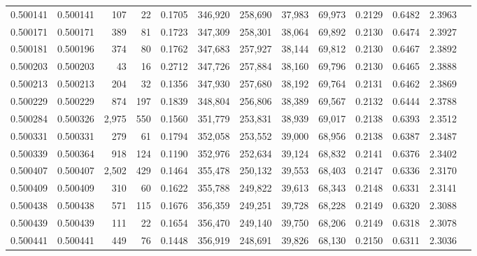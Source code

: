 \begin{tabular}{rrrrrrrrrrrrr}
0.500141 & 0.500141 &   107 &    22 &                                     0.1705 & 346,920 & 258,690 &  37,983 &  69,973 & 0.2129 & 0.6482 & 2.3963 \\
0.500171 & 0.500171 &   389 &    81 &                                     0.1723 & 347,309 & 258,301 &  38,064 &  69,892 & 0.2130 & 0.6474 & 2.3927 \\
0.500181 & 0.500196 &   374 &    80 &                                     0.1762 & 347,683 & 257,927 &  38,144 &  69,812 & 0.2130 & 0.6467 & 2.3892 \\
0.500203 & 0.500203 &    43 &    16 &                                     0.2712 & 347,726 & 257,884 &  38,160 &  69,796 & 0.2130 & 0.6465 & 2.3888 \\
0.500213 & 0.500213 &   204 &    32 &                                     0.1356 & 347,930 & 257,680 &  38,192 &  69,764 & 0.2131 & 0.6462 & 2.3869 \\
0.500229 & 0.500229 &   874 &   197 &                                     0.1839 & 348,804 & 256,806 &  38,389 &  69,567 & 0.2132 & 0.6444 & 2.3788 \\
0.500284 & 0.500326 & 2,975 &   550 &                                     0.1560 & 351,779 & 253,831 &  38,939 &  69,017 & 0.2138 & 0.6393 & 2.3512 \\
0.500331 & 0.500331 &   279 &    61 &                                     0.1794 & 352,058 & 253,552 &  39,000 &  68,956 & 0.2138 & 0.6387 & 2.3487 \\
0.500339 & 0.500364 &   918 &   124 &                                     0.1190 & 352,976 & 252,634 &  39,124 &  68,832 & 0.2141 & 0.6376 & 2.3402 \\
0.500407 & 0.500407 & 2,502 &   429 &                                     0.1464 & 355,478 & 250,132 &  39,553 &  68,403 & 0.2147 & 0.6336 & 2.3170 \\
0.500409 & 0.500409 &   310 &    60 &                                     0.1622 & 355,788 & 249,822 &  39,613 &  68,343 & 0.2148 & 0.6331 & 2.3141 \\
0.500438 & 0.500438 &   571 &   115 &                                     0.1676 & 356,359 & 249,251 &  39,728 &  68,228 & 0.2149 & 0.6320 & 2.3088 \\
0.500439 & 0.500439 &   111 &    22 &                                     0.1654 & 356,470 & 249,140 &  39,750 &  68,206 & 0.2149 & 0.6318 & 2.3078 \\
0.500441 & 0.500441 &   449 &    76 &                                     0.1448 & 356,919 & 248,691 &  39,826 &  68,130 & 0.2150 & 0.6311 & 2.3036 \\

\end{tabular}

